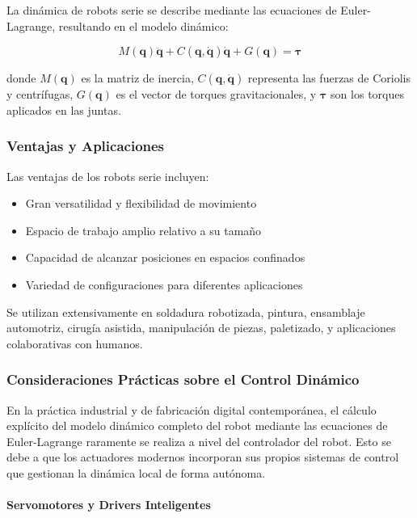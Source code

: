 La dinámica de robots serie se describe mediante las ecuaciones de Euler-Lagrange, resultando en el modelo dinámico:

\begin{equation}
M(\mathbf{q})\ddot{\mathbf{q}} + C(\mathbf{q}, \dot{\mathbf{q}})\dot{\mathbf{q}} + G(\mathbf{q}) = \boldsymbol{\tau}
\end{equation}

donde $M(\mathbf{q})$ es la matriz de inercia, $C(\mathbf{q}, \dot{\mathbf{q}})$ representa las fuerzas de Coriolis y centrífugas, $G(\mathbf{q})$ es el vector de torques gravitacionales, y $\boldsymbol{\tau}$ son los torques aplicados en las juntas.

\subsubsection{Ventajas y Aplicaciones}

Las ventajas de los robots serie incluyen:

\begin{itemize}
    \item Gran versatilidad y flexibilidad de movimiento
    \item Espacio de trabajo amplio relativo a su tamaño
    \item Capacidad de alcanzar posiciones en espacios confinados
    \item Variedad de configuraciones para diferentes aplicaciones
\end{itemize}

Se utilizan extensivamente en soldadura robotizada, pintura, ensamblaje automotriz, cirugía asistida, manipulación de piezas, paletizado, y aplicaciones colaborativas con humanos.
\subsubsection{Consideraciones Prácticas sobre el Control Dinámico}

En la práctica industrial y de fabricación digital contemporánea, el cálculo explícito del modelo dinámico completo del robot mediante las ecuaciones de Euler-Lagrange raramente se realiza a nivel del controlador del robot. Esto se debe a que los actuadores modernos incorporan sus propios sistemas de control que gestionan la dinámica local de forma autónoma.

\paragraph{Servomotores y Drivers Inteligentes}

